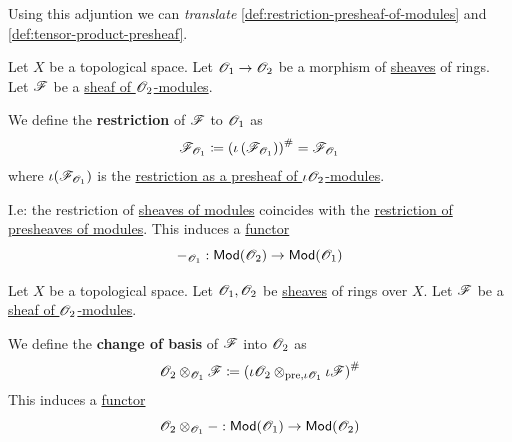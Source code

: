 \documentclass[../../../main]{subfiles}
\begin{document}
Using this adjuntion we can \textit{translate} \autoref{def:restriction-presheaf-of-modules} and \autoref{def:tensor-product-presheaf}.
\begin{definition}
  Let \(X\) be a topological space.
  Let \(\mathscr{O}_{1} \to \mathscr{O}_{2}\) be a morphism of \hyperref[def:sheaf]{sheaves} of rings.
  Let \(\mathscr{F}\) be a \hyperref[def:sheaf-of-modules]{sheaf of \(\mathscr{O}_{2}\)-modules}.

  We define the \textbf{restriction} of \(\mathscr{F}\) to \(\mathscr{O}_{1}\) as
  \begin{align*}
    \mathscr{F}_{\mathscr{O}_{1}} \coloneq \left( \iota \left( \mathscr{F}_{\mathscr{O}_{1}} \right) \right)^{\#} = \mathscr{F}_{\mathscr{O}_{1}}
  \end{align*}
  where \(\iota(\mathscr{F}_{\mathscr{O}_{1}})\) is the \hyperref[def:restriction-presheaf-of-modules]{restriction as a presheaf of \(\iota\mathscr{O}_{2}\)-modules}.

  I.e: the restriction of \hyperref[def:sheaf-of-modules]{sheaves of modules} coincides with the \hyperref[def:restriction-presheaf-of-modules]{restriction of presheaves of modules}.
  This induces a \hyperref[def:functor]{functor}
  \begin{equation*}
    -_{\mathscr{O}_{1}}: \mathsf{Mod}(\mathscr{O}_{2}) \to \mathsf{Mod}(\mathscr{O}_{1})
  \end{equation*}
\end{definition}

\begin{definition}
  Let \(X\) be a topological space.
  Let \(\mathscr{O}_{1}, \mathscr{O}_{2}\) be \hyperref[def:sheaf]{sheaves} of rings over \(X\).
  Let \(\mathscr{F}\) be a \hyperref[def:sheaf-of-modules]{sheaf of \(\mathscr{O}_{2}\)-modules}.

  We define the \textbf{change of basis} of \(\mathscr{F}\) into \(\mathscr{O}_{2}\) as
  \begin{equation*}
    \mathscr{O}_{2} \otimes_{\mathscr{O}_{1}} \mathscr{F} \coloneq \left( \iota\mathscr{O}_{2} \otimes_{\operatorname{pre}, \iota\mathscr{O}_{1}} \iota\mathscr{F} \right)^{\#}
  \end{equation*}
  This induces a \hyperref[def:functor]{functor}
  \begin{equation*}
    \mathscr{O}_{2} \otimes_{\mathscr{O}_{1}} -: \mathsf{Mod}(\mathscr{O}_{1}) \to \mathsf{Mod}(\mathscr{O}_{2})
  \end{equation*}
\end{definition}
\end{document}
